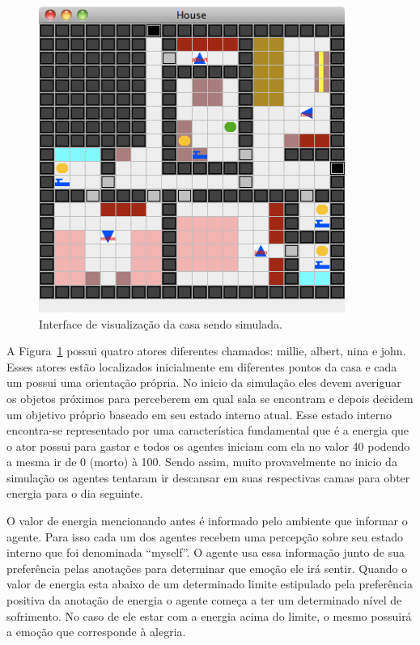 \begin{figure}
	\begin{center}
		\includegraphics[width=10cm]{figuras/sims.png}
	\end{center}
	\caption{Interface de visualização da casa sendo simulada.}
	\label{fig:sims}
\end{figure}

A Figura~\ref{fig:sims} possui quatro atores diferentes chamados: millie,
albert, nina e john. Esses atores estão localizados inicialmente em diferentes
pontos da casa e cada um possui uma orientação própria. No inicio da simulação eles
devem averiguar os objetos próximos para perceberem em qual sala se encontram
e depois decidem um objetivo próprio baseado em seu estado interno atual.
Esse estado interno encontra-se representado por uma característica
fundamental que é a energia que o ator possui para gastar e todos os agentes
iniciam com ela no valor 40 podendo a mesma ir de 0 (morto) à 100. Sendo
assim, muito provavelmente no inicio da simulação os agentes tentaram ir
descansar em suas respectivas camas para obter energia para o dia seguinte.

O valor de energia mencionando antes é informado pelo ambiente que informar o
agente. Para isso cada um dos agentes recebem uma percepção sobre seu estado
interno que foi denominada ``myself''. O agente usa essa informação junto de
sua preferência pelas anotações para determinar que emoção ele irá sentir.
Quando o valor de energia esta abaixo de um determinado limite estipulado pela
preferência positiva da anotação de energia o agente começa a ter um
determinado nível de sofrimento. No caso de ele estar com a energia acima do
limite, o mesmo possuirá a emoção que corresponde à alegria.

